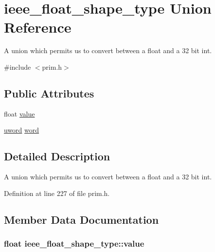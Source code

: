 \hypertarget{unionieee__float__shape__type}{}\section{ieee\+\_\+float\+\_\+shape\+\_\+type Union Reference}
\label{unionieee__float__shape__type}


A union which permits us to convert between a float and a 32 bit int.  




{\ttfamily \#include $<$prim.\+h$>$}

\subsection*{Public Attributes}
\begin{DoxyCompactItemize}
\item 
float \hyperlink{unionieee__float__shape__type_aa0c47451f1b974421cbb9e2833ddb68e}{value}
\item 
\hyperlink{real_2prim_8h_a6e60fe0e0f9f8801507e15fe2d893751}{uword} \hyperlink{unionieee__float__shape__type_acc20fbdec65fd390a9eea66249564ffb}{word}
\end{DoxyCompactItemize}


\subsection{Detailed Description}
A union which permits us to convert between a float and a 32 bit int. 

Definition at line 227 of file prim.\+h.



\subsection{Member Data Documentation}
\subsubsection[{\texorpdfstring{value}{value}}]{\setlength{\rightskip}{0pt plus 5cm}float ieee\+\_\+float\+\_\+shape\+\_\+type\+::value}\hypertarget{unionieee__float__shape__type_aa0c47451f1b974421cbb9e2833ddb68e}{}\label{unionieee__float__shape__type_aa0c47451f1b974421cbb9e2833ddb68e}



